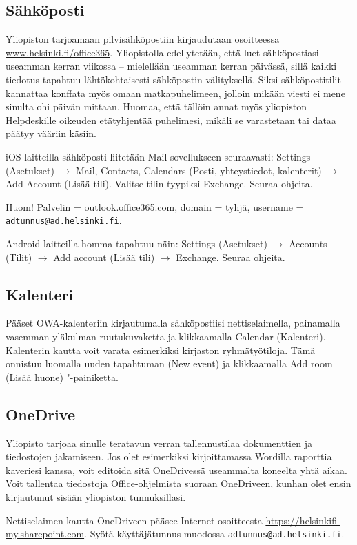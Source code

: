 \documentclass[a5paper, 8pt, twocolumn]{book} %
\numberwithin{equation}{section}
\begin{document}
\subsection*{Sähköposti}
Yliopiston tarjoamaan pilvi\-sähkö\-postiin kirjaudutaan osoitteessa \url{www.helsinki.fi/office365}. Yliopistolla edellytetään, että luet sähköpostiasi useamman kerran viikossa -- mielellään useamman kerran päivässä, sillä kaikki tiedotus tapahtuu lähtökohtaisesti sähköpostin välityksellä. Siksi sähköpostitilit kannattaa konffata myös omaan matkapuhelimeen, jolloin mikään viesti ei mene sinulta ohi päivän mittaan. Huomaa, että tällöin annat myös yliopiston Helpdeskille oikeuden etätyhjentää puhelimesi, mikäli se varastetaan tai dataa päätyy vääriin käsiin.

iOS-laitteilla sähköposti liitetään Mail-sovellukseen seuraavasti: Settings (Asetukset) $\rightarrow$ Mail, Contacts, Calendars (Posti, yhteystiedot, kalenterit) $\rightarrow$ Add Account (Lisää tili). Valitse tilin tyypiksi Exchange. Seuraa ohjeita. 

Huom! Palvelin = \url{outlook.office365.com}, domain = tyhjä, username = \texttt{adtunnus@ad.helsinki.fi}.

Android-laitteilla homma tapahtuu näin: Settings (Asetukset) $\rightarrow$ Accounts (Tilit) $\rightarrow$ Add account (Lisää tili) $\rightarrow$ Exchange. Seuraa ohjeita.
\subsection*{Kalenteri}
Pääset OWA-kalenteriin kirjautumalla sähköpostiisi nettiselaimella, painamalla vasemman yläkulman ruutu\-kuvaketta ja klikkaamalla Calendar (Kalenteri). Kalenterin kautta voit varata esimerkiksi kirjaston ryhmätyötiloja. Tämä onnistuu luomalla uuden tapahtuman (New event) ja klikkaamalla Add room (Lisää huone) "-painiketta.
\subsection*{OneDrive}
Yliopisto tarjoaa sinulle teratavun verran tallennustilaa dokumenttien ja tiedostojen jakamiseen. Jos olet esimerkiksi kirjoittamassa Wordilla raporttia kaveriesi kanssa, voit editoida sitä OneDrivessä useammalta koneelta yhtä aikaa. Voit tallentaa tiedostoja Office-ohjelmista suoraan OneDriveen, kunhan olet ensin kirjautunut sisään yliopiston tunnuksillasi.

Nettiselaimen kautta One\-Driveen pääsee Internet-osoitteesta \url{https://helsinkifi-my.sharepoint.com}. Syötä käyttäjätunnus muodossa \texttt{adtunnus@ad.helsinki.fi}.
\end{document}

